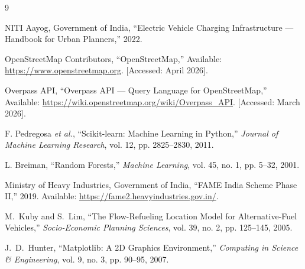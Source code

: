 \documentclass[12pt, a4paper]{article}
\begin{document}
\newpage
\begin{thebibliography}{9}

NITI Aayog, Government of India, ``Electric Vehicle Charging 
Infrastructure — Handbook for Urban Planners,'' 2022.

OpenStreetMap Contributors, ``OpenStreetMap,'' Available: 
\url{https://www.openstreetmap.org}. [Accessed: April 2026].

Overpass API, ``Overpass API — Query Language for OpenStreetMap,'' 
Available: \url{https://wiki.openstreetmap.org/wiki/Overpass_API}. 
[Accessed: March 2026].

F. Pedregosa \textit{et al.}, ``Scikit-learn: Machine Learning in 
Python,'' \textit{Journal of Machine Learning Research}, vol. 12, 
pp. 2825--2830, 2011.

L. Breiman, ``Random Forests,'' \textit{Machine Learning}, vol. 45, 
no. 1, pp. 5--32, 2001.

Ministry of Heavy Industries, Government of India, ``FAME India 
Scheme Phase II,'' 2019. Available: 
\url{https://fame2.heavyindustries.gov.in/}.

M.~Kuby and S.~Lim, ``The Flow-Refueling Location Model for 
Alternative-Fuel Vehicles,'' \textit{Socio-Economic Planning 
Sciences}, vol. 39, no. 2, pp. 125--145, 2005.

J.~D.~Hunter, ``Matplotlib: A 2D Graphics Environment,'' 
\textit{Computing in Science \& Engineering}, vol. 9, no. 3, 
pp. 90--95, 2007.

\end{thebibliography}
\end{document}
